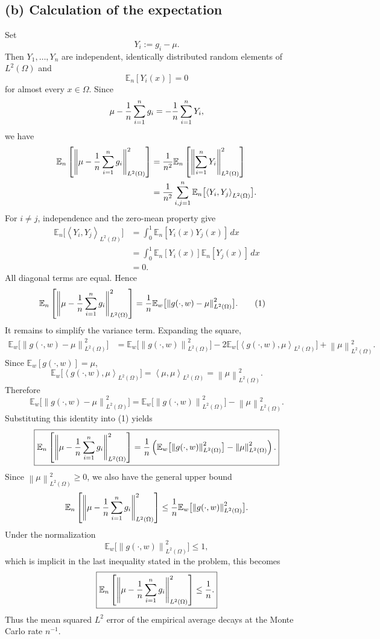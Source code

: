 \documentclass[11pt]{article}
\newcommand{\E}{\mathbb{E}}
\newcommand{\norm}[1]{\left\lVert #1\right\rVert}
\newcommand{\inner}[2]{\left\langle #1,#2\right\rangle}
\begin{document}
\subsection*{(b) Calculation of the expectation}

Set
\[
  Y_i:=g_i-\mu.
\]
Then $Y_1,\ldots,Y_n$ are independent, identically distributed random elements
of $L^2(\Omega)$ and
\[
  \E_n[Y_i(x)]=0
\]
for almost every $x\in\Omega$. Since
\[
  \mu-{1\over n}\sum_{i=1}^n g_i
  =-{1\over n}\sum_{i=1}^nY_i,
\]
we have
\begin{align*}
  \E_n\left[
    \norm{\mu-{1\over n}\sum_{i=1}^n g_i}_{L^2(\Omega)}^2
  \right]
  &= {1\over n^2}
  \E_n\left[
    \norm{\sum_{i=1}^nY_i}_{L^2(\Omega)}^2
  \right] \\
  &= {1\over n^2}
  \sum_{i,j=1}^n
  \E_n\bigl[\inner{Y_i}{Y_j}_{L^2(\Omega)}\bigr].
\end{align*}
For $i\ne j$, independence and the zero-mean property give
\begin{align*}
  \E_n\bigl[\inner{Y_i}{Y_j}_{L^2(\Omega)}\bigr]
  &=\int_0^1\E_n[Y_i(x)Y_j(x)]\,dx\\
  &=\int_0^1\E_n[Y_i(x)]\E_n[Y_j(x)]\,dx\\
  &=0.
\end{align*}
All diagonal terms are equal. Hence
\begin{align*}
  \E_n\left[
    \norm{\mu-{1\over n}\sum_{i=1}^n g_i}_{L^2(\Omega)}^2
  \right]
  &={1\over n}\E_w\bigl[
    \norm{g(\cdot,w)-\mu}_{L^2(\Omega)}^2
  \bigr].
  \tag{1}
\end{align*}
It remains to simplify the variance term. Expanding the square,
\begin{align*}
  \E_w\bigl[\norm{g(\cdot,w)-\mu}_{L^2(\Omega)}^2\bigr]
  &=\E_w\bigl[\norm{g(\cdot,w)}_{L^2(\Omega)}^2\bigr]
    -2\E_w\bigl[\inner{g(\cdot,w)}{\mu}_{L^2(\Omega)}\bigr]
    +\norm{\mu}_{L^2(\Omega)}^2.
\end{align*}
Since $\E_w[g(\cdot,w)]=\mu$,
\[
  \E_w\bigl[\inner{g(\cdot,w)}{\mu}_{L^2(\Omega)}\bigr]
  =\inner{\mu}{\mu}_{L^2(\Omega)}
  =\norm{\mu}_{L^2(\Omega)}^2.
\]
Therefore
\[
  \E_w\bigl[\norm{g(\cdot,w)-\mu}_{L^2(\Omega)}^2\bigr]
  =\E_w\bigl[\norm{g(\cdot,w)}_{L^2(\Omega)}^2\bigr]
   -\norm{\mu}_{L^2(\Omega)}^2.
\]
Substituting this identity into (1) yields
\[
  \boxed{
  \E_n\left[
    \norm{\mu-{1\over n}\sum_{i=1}^n g_i}_{L^2(\Omega)}^2
  \right]
  ={1\over n}\left(
    \E_w\bigl[\norm{g(\cdot,w)}_{L^2(\Omega)}^2\bigr]
    -\norm{\mu}_{L^2(\Omega)}^2
  \right).}
\]
Since $\norm{\mu}_{L^2(\Omega)}^2\ge0$, we also have the general upper bound
\[
  \E_n\left[
    \norm{\mu-{1\over n}\sum_{i=1}^n g_i}_{L^2(\Omega)}^2
  \right]
  \le {1\over n}
  \E_w\bigl[\norm{g(\cdot,w)}_{L^2(\Omega)}^2\bigr].
\]
Under the normalization
\[
  \E_w\bigl[\norm{g(\cdot,w)}_{L^2(\Omega)}^2\bigr]\le1,
\]
which is implicit in the last inequality stated in the problem, this becomes
\[
  \boxed{
  \E_n\left[
    \norm{\mu-{1\over n}\sum_{i=1}^n g_i}_{L^2(\Omega)}^2
  \right]\le {1\over n}.}
\]
Thus the mean squared $L^2$ error of the empirical average decays at the Monte
Carlo rate $n^{-1}$.
\end{document}
